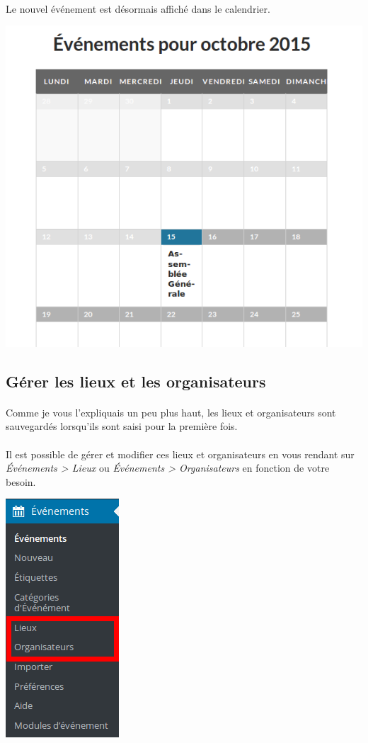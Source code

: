 \documentclass[10pt,a4paper]{article}
\begin{document}
\paragraph{}Le nouvel événement est désormais affiché dans le calendrier.
\begin{center}
\includegraphics[scale=0.3]{img/0199.png}
\end{center}
\newpage
\subsection{Gérer les lieux et les organisateurs}
\paragraph{}Comme je vous l'expliquais un peu plus haut, les lieux et organisateurs sont sauvegardés lorsqu'ils sont saisi pour la première fois.
\paragraph{}Il est possible de gérer et modifier ces lieux et organisateurs en vous rendant sur \textit{Événements > Lieux} ou \textit{Événements > Organisateurs} en fonction de votre besoin.
\begin{center}
\includegraphics[scale=0.3]{img/0202.png}
\end{center}
\end{document}
